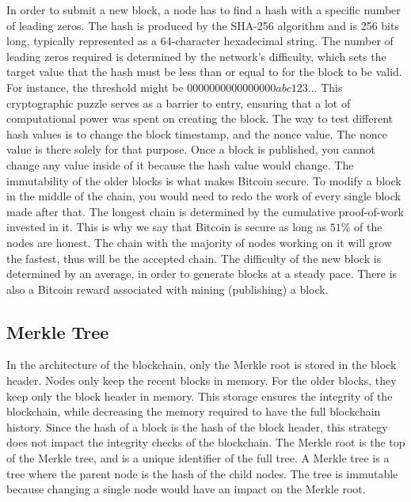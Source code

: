 In order to submit a new block, a node has to find a hash with a specific number of leading zeros.
The hash is produced by the SHA-256 algorithm and is 256 bits long, typically represented as a 64-character hexadecimal string. 
The number of leading zeros required is determined by the network's difficulty, which sets the target value that the hash must be less than or equal to for the block to be valid.
For instance, the threshold might be $0000000000000000abc123...$
This cryptographic puzzle serves as a barrier to entry, ensuring that a lot of computational power was spent on creating the block.
The way to test different hash values is to change the block timestamp, and the nonce value.
The nonce value is there solely for that purpose. Once a block is published, you cannot change any value inside of it because the hash value would change.
The immutability of the older blocks is what makes Bitcoin secure. To modify a block in the middle of the chain, you would need to redo the work of every single block made after that.
The longest chain is determined by the cumulative proof-of-work invested in it. This is why we say that Bitcoin is secure as long as $51\%$  of the nodes are honest.
The chain with the majority of nodes working on it will grow the fastest, thus will be the accepted chain.
The difficulty of the new block is determined by an average, in order to generate blocks at a steady pace. There is also a Bitcoin reward associated with mining (publishing) a block. \cite{MB17}


\subsection{Merkle Tree}
In the architecture of the blockchain, only the Merkle root is stored in the block header. Nodes only keep the recent blocks in memory. For the older blocks, they keep only the block header in memory.
This storage ensures the integrity of the blockchain, while decreasing the memory required to have the full blockchain history.
Since the hash of a block is the hash of the block header, this strategy does not impact the integrity checks of the blockchain.
The Merkle root is the top of the Merkle tree, and is a unique identifier of the full tree. A Merkle tree is a tree where the parent node is the hash of the child nodes.
The tree is immutable because changing a single node would have an impact on the Merkle root.


